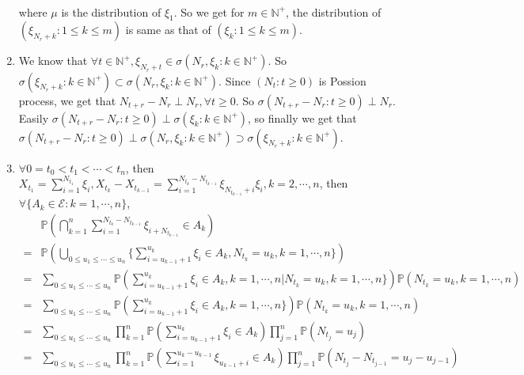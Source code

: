 \documentclass[../main]{subfiles}
\begin{document}
\begin{solution}
\begin{enumerate}
\begin{equation}
\begin{aligned}
        \end{aligned}
      \end{equation}
      where \(\mu\) is the distribution of \(\xi_1\).
      So we get for \(m \in \mathbb{N}^+\), the distribution of \((\xi_{N_r+k}:1 \leq k \leq m)\) is same as that of \((\xi_k:1 \leq k \leq m)\).
    \item
      We know that \(\forall t \in \mathbb{N}^+,\xi_{N_r + t} \in \sigma(N_r,\xi_k:k \in \mathbb{N}^+)\).
      So \(\sigma(\xi_{N_r + k}:k \in \mathbb{N}^+) \subset \sigma(N_r,\xi_k:k \in \mathbb{N}^+)\).
      Since \((N_t:t \geq 0)\) is Possion process, we get that \(N_{t + r}-N_r \perp N_r,\forall t \geq 0\).
      So \(\sigma(N_{t + r}-N_r:t \geq 0)\perp N_r\).
      Easily \(\sigma(N_{t + r}-N_r:t \geq 0)\perp \sigma(\xi_k:k \in \mathbb{N}^+)\), so finally we get that
      \(\sigma(N_{t + r}-N_r:t \geq 0)\perp \sigma(N_r,\xi_k:k \in \mathbb{N}^+)\supset \sigma(\xi_{N_r+k}:k \in \mathbb{N}^+)\).
    \item \(\forall 0 = t_0<t_1<\cdots<t_n\), then \(X_{t_1}=\sum_{i =1}^{N_{t_1}}\xi_i,X_{t_k}-X_{t_{k-1}}=\sum_{i=1}^{N_{t_k}-N_{t_{k-1}}}\xi_{N_{t_{k-1}} + i}\xi_i,k=2,\cdots,n\),
      then \(\forall\{A_k \in \mathscr{E}:k=1,\cdots,n\}\),
      \begin{equation}
        \begin{aligned}
            & \mathbb{P}(\bigcap_{k =1}^n \sum_{i=1}^{N_{t_k}-N_{t_{k-1}}}\xi_{i + N_{t_{k-1}}} \in A_k)                                                                                              \\
          = & \mathbb{P}(\bigcup_{0 \leq u_1\leq \cdots\leq u_n}\{\sum_{i=u_{k-1}+1}^{u_k}\xi_{i} \in A_k,N_{t_k}=u_k,k=1,\cdots,n\})                                                                 \\
          = & \sum_{0 \leq u_1\leq \cdots\leq u_n}\mathbb{P}(\sum_{i=u_{k-1} + 1}^{u_k}\xi_i  \in A_k, k=1,\cdots,n| N_{t_k}=u_k,k=1,\cdots,n\})\mathbb{P}(N_{t_{k}}=u_k,k=1,\cdots,n)                \\
          = & \sum_{0 \leq u_1\leq \cdots\leq u_n}\mathbb{P}(\sum_{i=u_{k-1} + 1}^{u_k}\xi_i  \in A_k, k=1,\cdots,n\})\mathbb{P}(N_{t_{k}}=u_k,k=1,\cdots,n)                                          \\
          = & \sum_{0 \leq u_1\leq \cdots\leq u_n}\prod_{k=1}^{n} \mathbb{P}(\sum_{i=u_{k-1} + 1}^{u_k}\xi_i  \in A_k)\prod_{j=1}^{n} \mathbb{P}(N_{t_{j}}=u_j)                                       \\
          = & \sum_{0 \leq u_1\leq \cdots\leq u_n}\prod_{k=1}^{n} \mathbb{P}(\sum_{i= 1}^{u_k-u_{k-1}}\xi_{u_{k-1}+ i}  \in A_k)\prod_{j=1}^{n} \mathbb{P}(N_{t_{j}}-N_{t_{j-1}}=u_j-u_{j-1})         \\

\end{aligned}
\end{equation}
\end{enumerate}
\end{solution}
\end{document}
